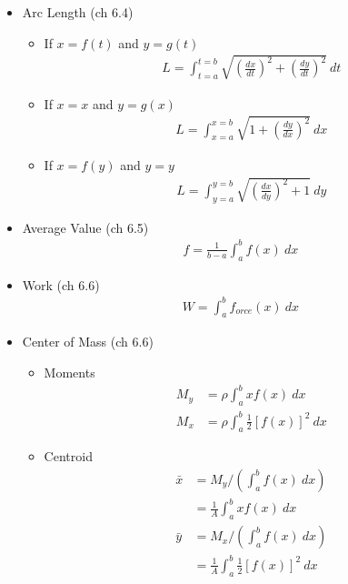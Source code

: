 \documentclass{report}
\begin{document}
\begin{multicols}{2}
\begin{itemize}[leftmargin=.25cm]
\item Arc Length (ch 6.4)
\begin{itemize}[leftmargin=.25cm]
\item If $ x = f(t) $ and $ y = g(t) $
\begin{align*}
L = \int_{t=a}^{t=b} \sqrt{ \left( \frac{dx}{dt} \right)^2 + \left( \frac{dy}{dt} \right)^2 } \ dt
\end{align*}

\item If $ x = x $ and $ y = g(x) $
\begin{align*}
L = \int_{x=a}^{x=b} \sqrt{ 1 + \left( \frac{dy}{dx} \right)^2 } \ dx
\end{align*}

\item If $ x = f(y) $ and $ y = y $
\begin{align*}
L = \int_{y=a}^{y=b} \sqrt{ \left( \frac{dx}{dy} \right)^2 + 1 } \ dy
\end{align*}
\end{itemize}




\item Average Value (ch 6.5)
\begin{align*}
f = \frac{1}{b-a} \int_a^b f(x) \ dx
\end{align*}




\item Work (ch 6.6)
\begin{align*}
W = \int_a^b f_{orce} (x) \ dx
\end{align*}




\item Center of Mass (ch 6.6)
\begin{itemize}[leftmargin=.25cm]
\item Moments
\begin{align*}
M_y &= \rho \int_a^b x f(x) \ dx \\
M_x &= \rho \int_a^b \frac{1}{2} \left[ f(x) \right]^2 \ dx
\end{align*}
\item Centroid
\begin{align*}
\bar{x} &= M_y / \left( \int_a^b f(x) \ dx \right) \\
&= \frac{1}{A} \int_a^b x f(x) \ dx \\
\bar{y} &= M_x / \left( \int_a^b f(x) \ dx \right) \\
&= \frac{1}{A} \int_a^b \frac{1}{2} \left[ f(x) \right]^2 \ dx
\end{align*}
\end{itemize}





\end{itemize}
\end{multicols}
\end{document}
